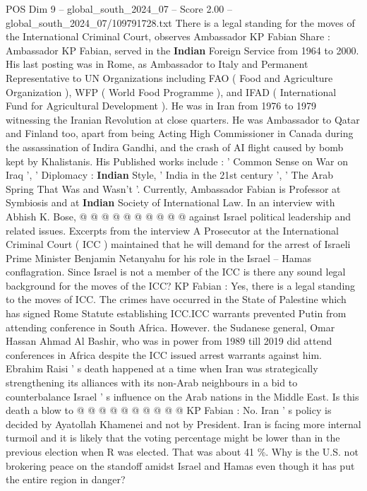 \begin{textsample}{POS Dim 9 – global\_south\_2024\_07 – Score 2.00 – global\_south\_2024\_07/109791728.txt}  \label{ex:f9_pos_105}
There is a legal standing for the moves of the International Criminal Court, observes Ambassador KP Fabian Share : Ambassador KP Fabian, served in the \textbf{Indian} Foreign Service from 1964 to 2000.
His last posting was in Rome, as Ambassador to Italy and Permanent Representative to UN Organizations including FAO ( Food and Agriculture Organization ), WFP ( World Food Programme ), and IFAD ( International Fund for Agricultural Development ).
He was in Iran from 1976 to 1979 witnessing the Iranian Revolution at close quarters.
He was Ambassador to Qatar and Finland too, apart from being Acting High Commissioner in Canada during the assassination of Indira Gandhi, and the crash of AI flight caused by bomb kept by Khalistanis.
His Published works include : ' Common Sense on War on Iraq ', ' Diplomacy : \textbf{Indian} Style, ' India in the 21st century ', ' The Arab Spring That Was and Wasn't '.
Currently, Ambassador Fabian is Professor at Symbiosis and at \textbf{Indian} Society of International Law.
In an interview with Abhish K.
Bose, @ @ @ @ @ @ @ @ @ @ against Israel political leadership and related issues.
Excerpts from the interview A Prosecutor at the International Criminal Court ( ICC ) maintained that he will demand for the arrest of Israeli Prime Minister Benjamin Netanyahu for his role in the Israel -- Hamas conflagration.
Since Israel is not a member of the ICC is there any sound legal background for the moves of the ICC?
KP Fabian : Yes, there is a legal standing to the moves of ICC.
The crimes have occurred in the State of Palestine which has signed Rome Statute establishing ICC.ICC warrants prevented Putin from attending conference in South Africa.
However. the Sudanese general, Omar Hassan Ahmad Al Bashir, who was in power from 1989 till 2019 did attend conferences in Africa despite the ICC issued arrest warrants against him.
Ebrahim Raisi ' s death happened at a time when Iran was strategically strengthening its alliances with its non-Arab neighbours in a bid to counterbalance Israel ' s influence on the Arab nations in the Middle East.
Is this death a blow to @ @ @ @ @ @ @ @ @ @ KP Fabian : No.
Iran ' s policy is decided by Ayatollah Khamenei and not by President.
Iran is facing more internal turmoil and it is likely that the voting percentage might be lower than in the previous election when R was elected.
That was about 41 \%.
Why is the U.S. not brokering peace on the standoff amidst Israel and Hamas even though it has put the entire region in danger?

\end{textsample}
